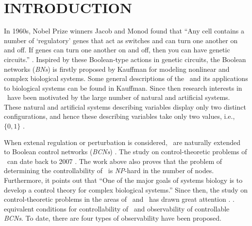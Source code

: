 \section{INTRODUCTION}

In 1960s, Nobel Prize winners Jacob and Monod found that  ``Any cell contains a number of `regulatory' genes that act as switches and can turn one another on and off. If genes can turn one another on and off, then you can have genetic circuits.'' \cite{Waldrop1992Complexity,cheng2009controllability}. Inspired by these Boolean-type actions in genetic circuits, the Boolean networks ({\em BNs}) is firstly proposed by Kauffman \cite{Kauffman1968Metabolic} for modeling nonlinear and complex biological systems. Some general descriptions of the \BNs\ and its applications to biological systems can be found in Kauffman. Since then research interests in  \BNs\ have been motivated by the large number of natural and artificial systems. These natural and artificial systems describing variables display only two distinct configurations, and hence these describing variables take only two values, i.e., $\{0,1\}$  \cite{Akutsu2000Inferring, Shmulevich2002From, Faur2006Dynamical,Green2007The,Lou2010Multi,Fornasini2013Observability}.

When extenal regulation or perturbation is considered, \BNs\ are naturally extended to Boolean control networks ({\em BCNs}) \cite{Ideker2001A}. The study on control-theoretic problems of \BCNs\ can date back to 2007 \cite{Akutsu2007Control}. The work above also proves that the problem of determining the controllability of \BCNs\ is {\em NP}-hard in the number of nodes. Furthermore, it points out that ``One of the major goals of systems biology is to develop a control theory for complex biological systems.'' Since then, the study on control-theoretic problems in the areas of \BNs\ and \BCNs\ has drawn great attention \cite{cheng2009controllability, Zhao2010Input, Cheng2011Identification, Cheng2011Analysis,Fornasini2013Observability}. .     equivalent conditions for controllability of \BCNs\ and observability of controllable {\em BCNs}. To date, there are four types of observability have been proposed. 

